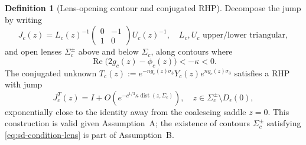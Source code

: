 \documentclass[12pt,a4paper]{amsart}
\theoremstyle{definition}
\newtheorem{definition}[theorem]{Definition}
\theoremstyle{remark}
\begin{document}
\begin{definition}[Lens-opening contour and conjugated RHP]
\label{def:lens}
Decompose the jump by writing
\begin{equation}\label{eq:lu-decomp}
  J_c(z)=L_c(z)^{-1}\begin{pmatrix}0&-1\\1&0\end{pmatrix}U_c(z)^{-1},
  \quad L_c,U_c\text{ upper/lower triangular},
\end{equation}
and open lenses $\Sigma_c^\pm$ above and below $\Sigma_c$, along
contours where
\begin{equation}\label{eq:sd-condition-lens}
  \operatorname{Re}\!\bigl(2g_c(z)-\phi_c(z)\bigr)<-\kappa<0.
\end{equation}
The conjugated unknown $T_c(z):=e^{-ng_c(z)\sigma_3}Y_c(z)e^{ng_c(z)\sigma_3}$
satisfies a RHP with jump
\begin{equation}\label{eq:T-jump}
  J_c^T(z)=I+O(e^{-c^{1/3}\kappa\operatorname{dist}(z,\Sigma_c)}),
  \quad z\in\Sigma_c^\pm\setminus D_\epsilon(0),
\end{equation}
exponentially close to the identity away from the coalescing saddle $z=0$.
This construction is valid given Assumption~A; the existence of
contours $\Sigma_c^\pm$ satisfying \eqref{eq:sd-condition-lens}
is part of Assumption~B.
\end{definition}
\end{document}
